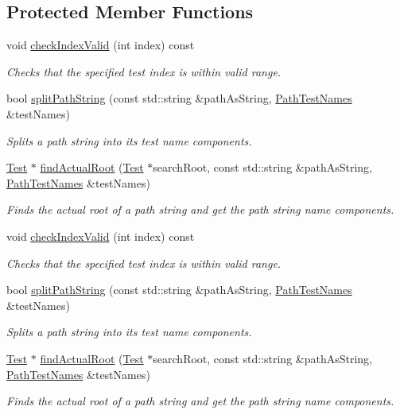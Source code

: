 \subsection*{Protected Member Functions}
\begin{DoxyCompactItemize}
\item 
void \hyperlink{class_test_path_aebf839170b1a9e8199dd26f307028b6a}{check\+Index\+Valid} (int index) const 
\begin{DoxyCompactList}\small\item\em Checks that the specified test index is within valid range. \end{DoxyCompactList}\item 
bool \hyperlink{class_test_path_a7b65b26e7287763ca94ff0fadca37652}{split\+Path\+String} (const std\+::string \&path\+As\+String, \hyperlink{class_test_path_a525c33f5b897710bf37cf593160e562a}{Path\+Test\+Names} \&test\+Names)
\begin{DoxyCompactList}\small\item\em Splits a path string into its test name components. \end{DoxyCompactList}\item 
\hyperlink{class_test}{Test} $\ast$ \hyperlink{class_test_path_a4229e1e693fbadd725d532e4a92e7d6d}{find\+Actual\+Root} (\hyperlink{class_test}{Test} $\ast$search\+Root, const std\+::string \&path\+As\+String, \hyperlink{class_test_path_a525c33f5b897710bf37cf593160e562a}{Path\+Test\+Names} \&test\+Names)
\begin{DoxyCompactList}\small\item\em Finds the actual root of a path string and get the path string name components. \end{DoxyCompactList}\item 
void \hyperlink{class_test_path_aebf839170b1a9e8199dd26f307028b6a}{check\+Index\+Valid} (int index) const 
\begin{DoxyCompactList}\small\item\em Checks that the specified test index is within valid range. \end{DoxyCompactList}\item 
bool \hyperlink{class_test_path_a7b65b26e7287763ca94ff0fadca37652}{split\+Path\+String} (const std\+::string \&path\+As\+String, \hyperlink{class_test_path_a525c33f5b897710bf37cf593160e562a}{Path\+Test\+Names} \&test\+Names)
\begin{DoxyCompactList}\small\item\em Splits a path string into its test name components. \end{DoxyCompactList}\item 
\hyperlink{class_test}{Test} $\ast$ \hyperlink{class_test_path_a4fb2b835af58884dc718a3692f013868}{find\+Actual\+Root} (\hyperlink{class_test}{Test} $\ast$search\+Root, const std\+::string \&path\+As\+String, \hyperlink{class_test_path_a525c33f5b897710bf37cf593160e562a}{Path\+Test\+Names} \&test\+Names)
\begin{DoxyCompactList}\small\item\em Finds the actual root of a path string and get the path string name components. \end{DoxyCompactList}\end{DoxyCompactItemize}
